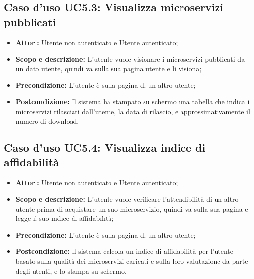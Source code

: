\documentclass[12pt,a4paper,titlepage]{article}
\begin{document}
	\subsection{Caso d'uso UC5.3: Visualizza microservizi pubblicati}
	\label{UC5.3}
	\begin{itemize}
		\item \textbf{Attori: }Utente non autenticato e Utente autenticato;
		\item \textbf{Scopo e descrizione: }L'utente vuole visionare i microservizi pubblicati da un dato utente, quindi va sulla sua pagina utente e li visiona;
		\item \textbf{Precondizione: }L'utente è sulla pagina di un altro utente;
		\item \textbf{Postcondizione: }Il sistema ha stampato su schermo una tabella che indica i microservizi rilasciati dall'utente, la data di rilascio, e approssimativamente il numero di download.
	\end{itemize}
	\subsection{Caso d'uso UC5.4: Visualizza indice di affidabilità}
	\label{UC5.4}
	\begin{itemize}
		\item \textbf{Attori: }Utente non autenticato e Utente autenticato;
		\item \textbf{Scopo e descrizione: }L'utente vuole verificare l'attendibilità di un altro utente prima di acquistare un suo microservizio, quindi va sulla sua pagina e legge il suo indice di affidabilità;
		\item \textbf{Precondizione: }L'utente è sulla pagina di un altro utente;
		\item \textbf{Postcondizione: }Il sistema calcola un indice di affidabilità per l'utente basato sulla qualità dei microservizi caricati e sulla loro valutazione da parte degli utenti, e lo stampa su schermo.
	\end{itemize}
\end{document}
